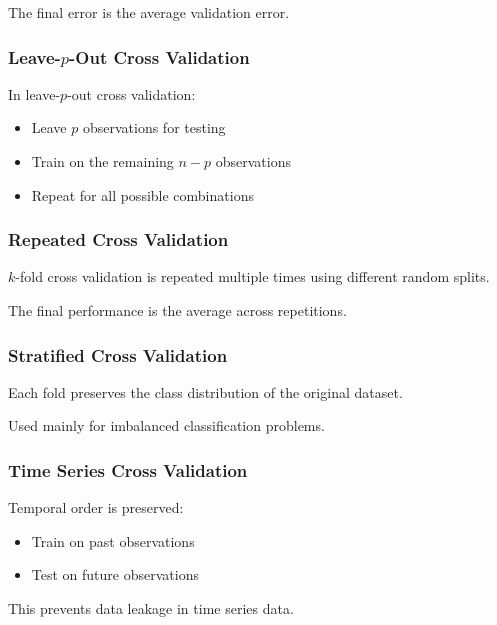 \documentclass[10pt,a4paper]{article}
\begin{document}
	The final error is the average validation error.
	
	\subsubsection{Leave-\(p\)-Out Cross Validation}
	In leave-\(p\)-out cross validation:
	\begin{itemize}
	    \item Leave \(p\) observations for testing
	    \item Train on the remaining \(n-p\) observations
	    \item Repeat for all possible combinations
	\end{itemize}
	
	\subsubsection{Repeated Cross Validation}
	\(k\)-fold cross validation is repeated multiple times using different random splits.
	
	The final performance is the average across repetitions.
	
	\subsubsection{Stratified Cross Validation}
	Each fold preserves the class distribution of the original dataset.
	
	Used mainly for imbalanced classification problems.
	
	\subsubsection{Time Series Cross Validation}
	Temporal order is preserved:
	\begin{itemize}
	    \item Train on past observations
	    \item Test on future observations
	\end{itemize}
	
	This prevents data leakage in time series data.
	
	
\end{document}
